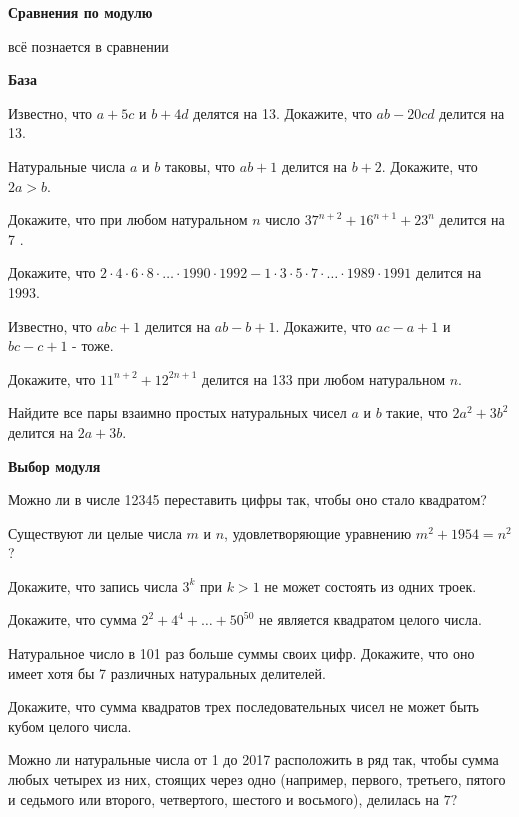 \centerline{\bf \Huge Сравнения по модулю}

\begin{flushright}
        \scriptsize{всё познается в сравнении}
\end{flushright}

\textbf{\Large База}

Известно, что $a+5 c$ и $b+4 d$ делятся на 13. Докажите, что $a b-20 c d$ делится на 13.

Натуральные числа $a$ и $b$ таковы, что $a b+1$ делится на $b+2$. Докажите, что $2 a>b$.

Докажите, что при любом натуральном $n$ число $37^{n+2}+16^{n+1}+23^n$ делится на 7 .

Докажите, что $2 \cdot 4 \cdot 6 \cdot 8 \cdot \ldots \cdot 1990 \cdot 1992-1 \cdot 3 \cdot 5 \cdot 7 \cdot \ldots \cdot 1989 \cdot 1991$ делится на 1993.

Известно, что $a b c+1$ делится на $a b-b+1$. Докажите, что $a c-a+1$ и $b c-c+1$ - тоже.

Докажите, что $11^{n+2}+12^{2 n+1}$ делится на 133 при любом натуральном $n$.

Найдите все пары взаимно простых натуральных чисел $a$ и $b$ такие, что $2 a^2+3 b^2$ делится на $2 a+3 b$.

\textbf{\Large Выбор модуля}

Можно ли в числе 12345 переставить цифры так, чтобы оно стало квадратом?

Существуют ли целые числа $m$ и $n$, удовлетворяющие уравнению $m^2+1954=n^2$ ?

Докажите, что запись числа $3^k$ при $k>1$ не может состоять из одних троек.

Докажите, что сумма $2^2+4^4+\ldots+50^{50}$ не является квадратом целого числа.

Натуральное число в 101 раз больше суммы своих цифр. Докажите, что оно имеет хотя бы 7 различных натуральных делителей.

Докажите, что сумма квадратов трех последовательных чисел не может быть кубом целого числа.

Можно ли натуральные числа от 1 до 2017 расположить в ряд так, чтобы сумма любых четырех из них, стоящих через одно (например, первого, третьего, пятого и седьмого или второго, четвертого, шестого и восьмого), делилась на $7?$